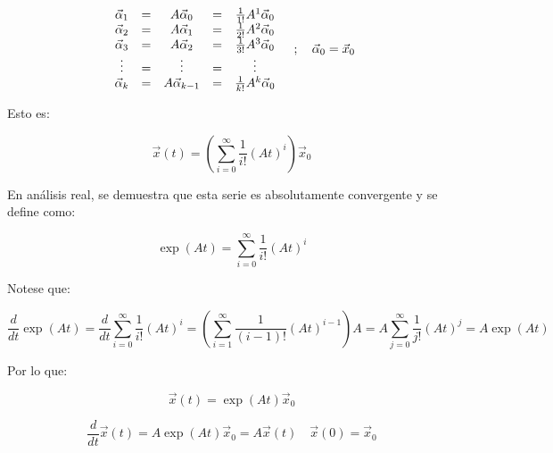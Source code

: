 \begin{enumerate}
        \begin{equation}
            \begin{array}{c c c c c}
            \vec{\alpha}_1 & = & A \vec{\alpha}_0     & = & \frac{1}{1!} A^1 \vec{\alpha}_0 \\
            \vec{\alpha}_2 & = & A \vec{\alpha}_1     & = & \frac{1}{2!} A^2 \vec{\alpha}_0 \\
            \vec{\alpha}_3 & = & A \vec{\alpha}_2     & = & \frac{1}{3!} A^3 \vec{\alpha}_0 \\
            \vdots   & = & \vdots         & = & \vdots                    \\
            \vec{\alpha}_k & = & A \vec{\alpha}_{k-1} & = & \frac{1}{k!} A^k \vec{\alpha}_0 \\
            \end{array} \quad ; \quad \vec{\alpha}_0 = \vec{x}_0
        \end{equation}

        Esto es:

        \begin{equation}
            \vec{x}(t) = \left( \sum\limits_{i = 0}^{\infty} \frac{1}{i!} (A t)^i \right) \vec{x}_0 \nonumber
        \end{equation}

        En análisis real, se demuestra que esta serie es absolutamente convergente y se define como:

        \begin{equation}
            \exp{(At)} = \sum\limits_{i = 0}^{\infty} \frac{1}{i!} (A t)^i
        \end{equation}

        Notese que:

        \begin{equation*}
            \frac{d}{dt} \exp{(At)} = \frac{d}{dt} \sum\limits_{i=0}^{\infty} \frac{1}{i!} (At)^i = \left( \sum\limits_{i=1}^{\infty} \frac{1}{(i-1)!} (At)^{i-1} \right) A = A \sum\limits_{j=0}^{\infty} \frac{1}{j!} (At)^j = A \exp{(At)}
        \end{equation*}

        Por lo que:

        \begin{equation*}
            \vec{x}(t) = \exp{(At)} \vec{x}_0
        \end{equation*}

        \begin{equation*}
            \frac{d}{dt} \vec{x}(t) = A \exp{(At)} \vec{x}_0 = A \vec{x}(t) \quad \vec{x}(0) = \vec{x}_0
        \end{equation*}


\end{enumerate}
